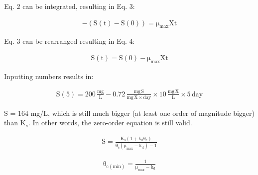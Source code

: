 \documentclass[12pt,letterpaper]{article}
\begin{document}
\begin{enumerate}
\begin{enumerate}
Eq. 2 can be integrated, resulting in Eq. 3: 

\begin{align}
\mathrm{-(S(t) - S(0)) = \mu_{max}Xt}
\end{align}

Eq. 3 can be rearranged resulting in Eq. 4:

\begin{align}
\mathrm{S(t) = S(0) - \mu_{max}Xt}
\end{align}

Inputting numbers results in:

\begin{align*}
\mathrm{S(5) = 200\, \frac{mg}{L} - 0.72\, \frac{mg\, S}{mg\, X\times day}\times 10\, \frac{mg\, X}{L} \times 5\, day}
\end{align*}

S = 164 mg/L, which is still much bigger (at least one order of magnitude bigger) than K$_s$.  In other words, the zero-order equation is still valid.


\begin{align*}
\mathrm{S = \frac{K_s(1 + k_d\theta_c)}{\theta_c(\mu_{max} - k_d) - 1}}
\end{align*}

\begin{align*}
\mathrm{\theta_{c(min)} = \frac{1}{\mu_{max} - k_d}}
\end{align*}



\end{enumerate}




\end{enumerate}
\end{document}
